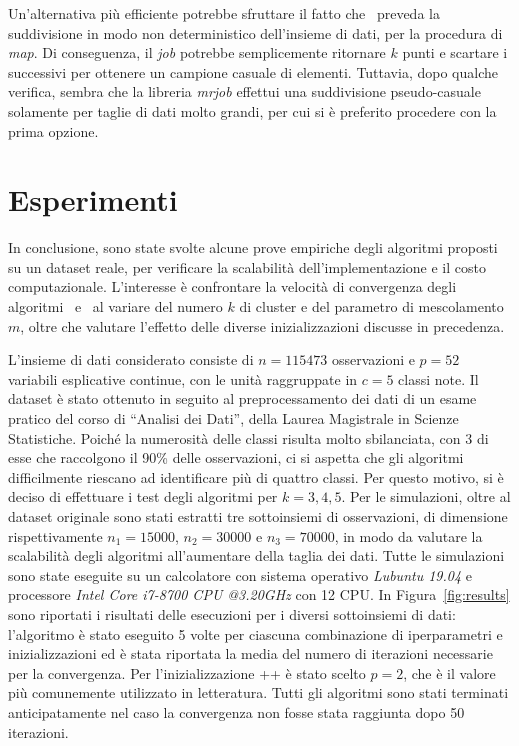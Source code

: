 \documentclass[runningheads]{llncs}
\begin{document}
Un'alternativa più efficiente potrebbe sfruttare il fatto che \mr\ preveda la suddivisione in modo non deterministico dell'insieme di dati, per la procedura di \textit{map}. Di conseguenza, il \textit{job} potrebbe semplicemente ritornare $k$ punti e scartare i successivi per ottenere un campione casuale di elementi. Tuttavia, dopo qualche verifica, sembra che la libreria \textit{mrjob} effettui una suddivisione pseudo-casuale solamente per taglie di dati molto grandi, per cui si è preferito procedere con la prima opzione.

\section{Esperimenti}\label{cap:esperimenti}
In conclusione, sono state svolte alcune prove empiriche degli algoritmi proposti su un dataset reale, per verificare la scalabilità dell'implementazione e il costo computazionale.
L'interesse è confrontare la velocità di convergenza degli algoritmi \km\ e \fcm\ al variare del numero $k$ di cluster e del parametro di mescolamento $m$, oltre che valutare l'effetto delle diverse inizializzazioni discusse in precedenza.

L'insieme di dati considerato consiste di $n = 115473$ osservazioni e $p = 52$ variabili esplicative continue, con le unità raggruppate in $c = 5$ classi note. 
Il dataset è stato ottenuto in seguito al preprocessamento dei dati di un esame pratico del corso di ``Analisi dei Dati'', della Laurea Magistrale in Scienze Statistiche.
Poiché la numerosità delle classi risulta molto sbilanciata, con $3$ di esse che raccolgono il 90\% delle osservazioni, ci si aspetta che gli algoritmi difficilmente riescano ad identificare più di quattro classi.
Per questo motivo, si è deciso di effettuare i test degli algoritmi per $k = 3,4,5$.
Per le simulazioni, oltre al dataset originale sono stati estratti tre sottoinsiemi di osservazioni, di dimensione rispettivamente $n_1 = 15000$, $n_2 = 30000$ e $n_3 = 70000$, in modo da valutare la scalabilità degli algoritmi all'aumentare della taglia dei dati. Tutte le simulazioni sono state eseguite su un calcolatore con sistema operativo \textit{Lubuntu 19.04} e processore \textit{Intel Core i7-8700 CPU @3.20GHz} con 12 CPU.
In Figura~\ref{fig:results} sono riportati i risultati delle esecuzioni per i diversi sottoinsiemi di dati: l'algoritmo è stato eseguito 5 volte per ciascuna combinazione di iperparametri e inizializzazioni ed è stata riportata la media del numero di iterazioni necessarie per la convergenza.
Per l'inizializzazione ++ è stato scelto $p=2$, che è il valore più comunemente utilizzato in letteratura.
Tutti gli algoritmi sono stati terminati anticipatamente nel caso la convergenza non fosse stata raggiunta dopo 50 iterazioni.
\end{document}
